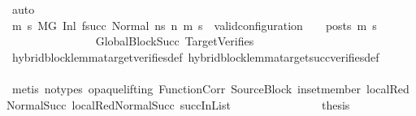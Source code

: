 \begin{isabellebody}
\ auto\isanewline
\ \ \isanewline
\ \ \ \ \ \ \ \ \ \ \ \ \isamarkupfalse%
\ {\isachardoublequoteopen}{\isasymforall}m{}{\isacharprime}{\kern0pt}\ s{}{\isacharprime}{\kern0pt}{\isachardot}{\kern0pt}{\isacharparenleft}{\kern0pt}\ M{\isacharcomma}{\kern0pt}{\isasymLambda}{\isacharcomma}{\kern0pt}{\isasymGamma}{\isacharcomma}{\kern0pt}{\isasymOmega}{\isacharcomma}{\kern0pt}G{\isacharprime}{\kern0pt}\ {\isasymturnstile}{\isacharparenleft}{\kern0pt}Inl\ {\isacharparenleft}{\kern0pt}f{\isacharparenleft}{\kern0pt}succ{\isacharparenright}{\kern0pt}{\isacharparenright}{\kern0pt}{\isacharcomma}{\kern0pt}\ Normal\ ns{\isacharprime}{\kern0pt}{\isacharparenright}{\kern0pt}\ {\isacharminus}{\kern0pt}n{\isasymrightarrow}{\isacharasterisk}{\kern0pt}\ {\isacharparenleft}{\kern0pt}m{}{\isacharprime}{\kern0pt}{\isacharcomma}{\kern0pt}\ s{}{\isacharprime}{\kern0pt}{\isacharparenright}{\kern0pt}{\isacharparenright}{\kern0pt}\ {\isasymlongrightarrow}\ valid{\isacharunderscore}{\kern0pt}configuration\ {\isasymLambda}\ {\isasymGamma}\ {\isasymOmega}\ posts\ m{}{\isacharprime}{\kern0pt}\ s{}{\isacharprime}{\kern0pt}{\isachardoublequoteclose}\isanewline
\ \ \ \ \ \ \ \ \ \ \ \ \ \ \isamarkupfalse%
\ GlobalBlockSucc\ TargetVerifies\isanewline
\ \ \ \ \ \ \ \ \ \ \ \ \ \ \isamarkupfalse%
\ hybrid{\isacharunderscore}{\kern0pt}block{\isacharunderscore}{\kern0pt}lemma{\isacharunderscore}{\kern0pt}target{\isacharunderscore}{\kern0pt}verifies{\isacharunderscore}{\kern0pt}def\ hybrid{\isacharunderscore}{\kern0pt}block{\isacharunderscore}{\kern0pt}lemma{\isacharunderscore}{\kern0pt}target{\isacharunderscore}{\kern0pt}succ{\isacharunderscore}{\kern0pt}verifies{\isacharunderscore}{\kern0pt}def\isanewline
\ \ \ \ \ \ \ \ \ \ \ \ \ \ \isamarkupfalse%
\ {\isacharparenleft}{\kern0pt}metis\ {\isacharparenleft}{\kern0pt}no{\isacharunderscore}{\kern0pt}types{\isacharcomma}{\kern0pt}\ opaque{\isacharunderscore}{\kern0pt}lifting{\isacharparenright}{\kern0pt}\ FunctionCorr\ SourceBlock\ in{\isacharunderscore}{\kern0pt}set{\isacharunderscore}{\kern0pt}member\ local{\isachardot}{\kern0pt}RedNormalSucc{\isacharparenleft}{\kern0pt}{}{\isacharparenright}{\kern0pt}\ local{\isachardot}{\kern0pt}RedNormalSucc{\isacharparenleft}{\kern0pt}{}{\isacharparenright}{\kern0pt}\ succInList{\isacharparenright}{\kern0pt}\isanewline
\ \ \ \ \ \ \ \ \ \ \ \ \isamarkupfalse%
\ \isamarkupfalse%
\ {\isacharquery}{\kern0pt}thesis\isanewline

\end{isabellebody}
